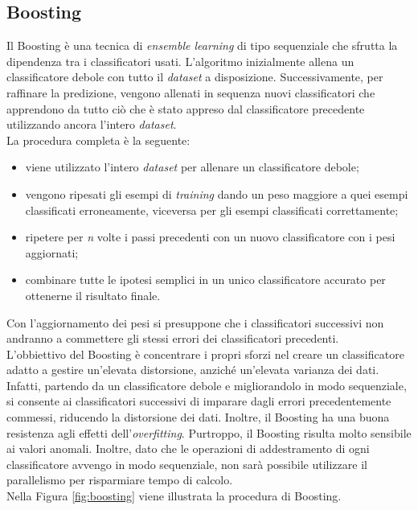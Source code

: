 \subsection{Boosting}
Il Boosting \autocite{freund1996experiments} è una tecnica di \emph{ensemble learning} di tipo sequenziale che sfrutta la dipendenza tra i classificatori usati. L'algoritmo inizialmente allena un classificatore debole con tutto il \emph{dataset} a disposizione. Successivamente, per raffinare la predizione, vengono allenati in sequenza nuovi classificatori che apprendono da tutto ciò che è stato appreso dal classificatore precedente utilizzando ancora l'intero \emph{dataset}.\\
La procedura completa è la seguente:
\begin{itemize}
	\item viene utilizzato l'intero \emph{dataset} per allenare un classificatore debole;
	\item vengono ripesati gli esempi di \emph{training} dando un peso maggiore a quei esempi classificati erroneamente, viceversa per gli esempi classificati correttamente;
	\item ripetere per \emph{n} volte i passi precedenti con un nuovo classificatore con i pesi aggiornati;
	\item combinare tutte le ipotesi semplici in un unico classificatore accurato per ottenerne il risultato finale.
\end{itemize}
Con l'aggiornamento dei pesi si presuppone che i classificatori successivi non andranno a commettere gli stessi errori dei classificatori precedenti.\\
L'obbiettivo del Boosting è concentrare i propri sforzi nel creare un classificatore adatto a gestire un'elevata distorsione, anziché un'elevata varianza dei dati. Infatti, partendo da un classificatore debole e migliorandolo in modo sequenziale, si consente ai classificatori successivi di imparare dagli errori precedentemente commessi, riducendo la distorsione dei dati. Inoltre, il Boosting ha una buona resistenza agli effetti dell'\emph{overfitting}.
Purtroppo, il Boosting risulta molto sensibile ai valori anomali. Inoltre, dato che le operazioni di addestramento di ogni classificatore avvengo in modo sequenziale, non sarà possibile utilizzare il parallelismo per risparmiare tempo di calcolo.\\
Nella Figura \ref{fig:boosting} viene illustrata la procedura di Boosting.

